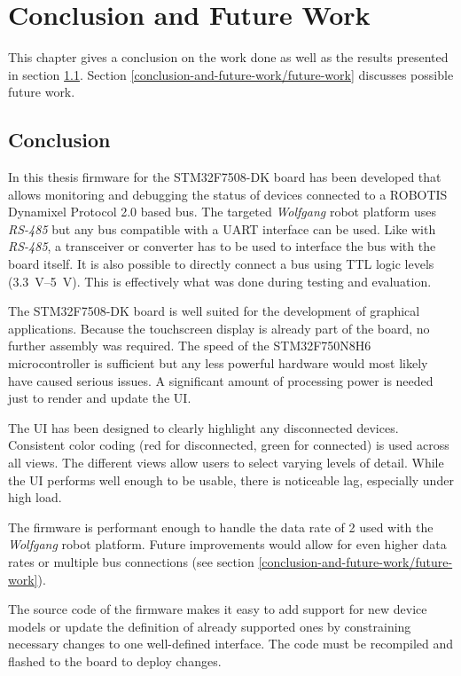 \chapter{Conclusion and Future Work}
\label{conclusion-and-future-work}

This chapter gives a conclusion on the work done as well as the results presented in section
\ref{conclusion-and-future-work/conclusion}. Section \ref{conclusion-and-future-work/future-work}
discusses possible future work.

\section{Conclusion}
\label{conclusion-and-future-work/conclusion}

In this thesis firmware for the STM32F7508-DK board has been developed that allows monitoring and
debugging the status of devices connected to a ROBOTIS Dynamixel Protocol 2.0 based bus. The targeted
\textit{Wolfgang} robot platform uses \textit{RS-485} but any bus compatible with a UART interface
can be used. Like with \textit{RS-485}, a transceiver or converter has to be used to interface the
bus with the board itself. It is also possible to directly connect a bus using TTL logic levels
(\SIrange{3.3}{5}{\volt}). This is effectively what was done during testing and evaluation.

The STM32F7508-DK board is well suited for the development of graphical applications. Because the
touchscreen display is already part of the board, no further assembly was required. The speed of
the STM32F750N8H6 microcontroller is sufficient but any less powerful hardware would most likely
have caused serious issues. A significant amount of processing power is needed just to render and
update the UI.

The UI has been designed to clearly highlight any disconnected devices. Consistent color coding
(red for disconnected, green for connected) is used across all views. The different views allow
users to select varying levels of detail. While the UI performs well enough to be usable, there
is noticeable lag, especially under high load.

The firmware is performant enough to handle the data rate of \SI{2}{} used with the
\textit{Wolfgang} robot platform. Future improvements would allow for even higher data rates or
multiple bus connections (see section \ref{conclusion-and-future-work/future-work}).

The source code of the firmware makes it easy to add support for new device models or update the
definition of already supported ones by constraining necessary changes to one well-defined
interface. The code must be recompiled and flashed to the board to deploy changes.

